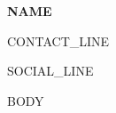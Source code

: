 \documentclass[11pt,a4paper]{article}
\begin{document}
\begin{center}

{\Huge \textbf{{{NAME}}}} \\

\vspace{0.2cm}

{{CONTACT_LINE}}

\vspace{0.1cm}

{{SOCIAL_LINE}}

\end{center}

\vspace{0.3cm}

{{BODY}}
\end{document}
